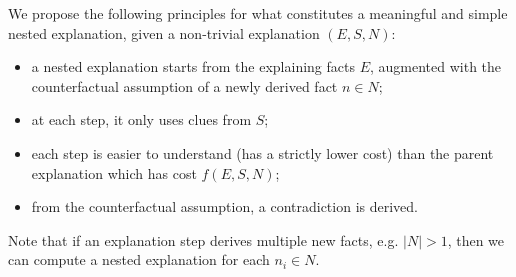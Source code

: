 






We propose the following principles for what constitutes a meaningful and simple nested explanation, given a non-trivial explanation $(E,S,N)$:
\begin{itemize}
 \item a nested explanation starts from the explaining facts $E$, %
 augmented with the counterfactual assumption of a newly derived fact $n \in N$; 
 \item at each step, it only uses clues from $S$;
 \item each step is easier to understand (has a strictly lower cost) than the parent explanation which has cost $f(E,S,N)$;
 \item from the counterfactual assumption, a contradiction is derived. %
\end{itemize}

Note that if an explanation step derives multiple new facts, e.g. $|N| > 1$, then we can compute a nested explanation for each $n_i \in N$.

